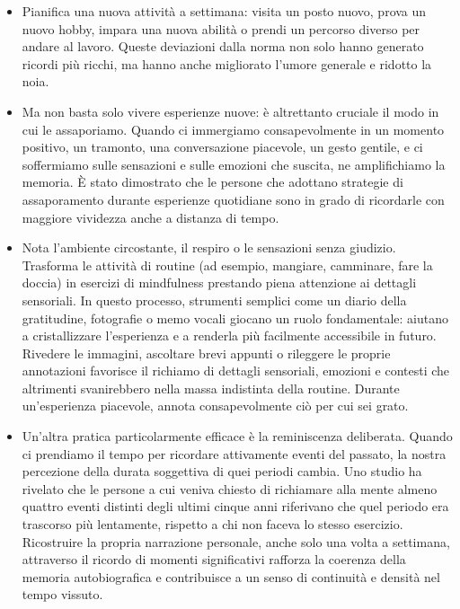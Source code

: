\documentclass[12pt]{book} %
\begin{document}
\begin{itemize}
\item Pianifica una nuova attività a settimana: visita un posto nuovo, prova un nuovo hobby, impara una nuova abilità o prendi un percorso diverso per andare al lavoro. Queste deviazioni dalla norma non solo hanno generato ricordi più ricchi, ma hanno anche migliorato l’umore generale e ridotto la noia.
\item Ma non basta solo vivere esperienze nuove: è altrettanto cruciale il modo in cui le assaporiamo. Quando ci immergiamo consapevolmente in un momento positivo, un tramonto, una conversazione piacevole, un gesto gentile, e ci soffermiamo sulle sensazioni e sulle emozioni che suscita, ne amplifichiamo la memoria. È stato dimostrato che le persone che adottano strategie di assaporamento durante esperienze quotidiane sono in grado di ricordarle con maggiore vividezza anche a distanza di tempo. 
\item Nota l'ambiente circostante, il respiro o le sensazioni senza giudizio. Trasforma le attività di routine (ad esempio, mangiare, camminare, fare la doccia) in esercizi di mindfulness prestando piena attenzione ai dettagli sensoriali. In questo processo, strumenti semplici come un diario della gratitudine, fotografie o memo vocali giocano un ruolo fondamentale: aiutano a cristallizzare l’esperienza e a renderla più facilmente accessibile in futuro. Rivedere le immagini, ascoltare brevi appunti o rileggere le proprie annotazioni favorisce il richiamo di dettagli sensoriali, emozioni e contesti che altrimenti svanirebbero nella massa indistinta della routine. Durante un'esperienza piacevole, annota consapevolmente ciò per cui sei grato.
\item Un’altra pratica particolarmente efficace è la reminiscenza deliberata. Quando ci prendiamo il tempo per ricordare attivamente eventi del passato, la nostra percezione della durata soggettiva di quei periodi cambia. Uno studio ha rivelato che le persone a cui veniva chiesto di richiamare alla mente almeno quattro eventi distinti degli ultimi cinque anni riferivano che quel periodo era trascorso più lentamente, rispetto a chi non faceva lo stesso esercizio. Ricostruire la propria narrazione personale, anche solo una volta a settimana, attraverso il ricordo di momenti significativi rafforza la coerenza della memoria autobiografica e contribuisce a un senso di continuità e densità nel tempo vissuto.

\end{itemize}
\end{document}
